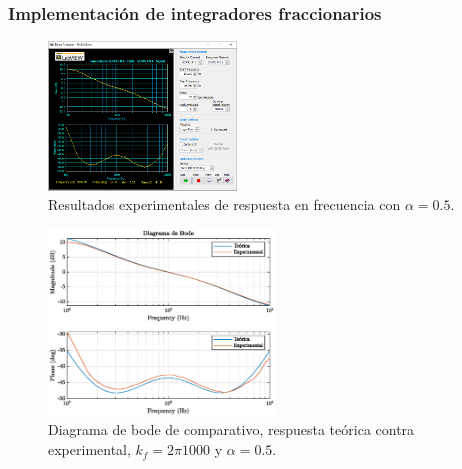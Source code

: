 \documentclass[10pt]{beamer}
\begin{document}
	\begin{frame}
		\frametitle{Implementación de integradores fraccionarios}
		\begin{minipage}[t]{0.45\textwidth}
			\begin{figure}[!ht] 
		\caption{Resultados experimentales de respuesta en frecuencia con $\alpha = 0.5$.}
		\label{fig:W1_impl_seg_ord}
		\centering
		\includegraphics[width = 5cm]{../imagenes/W1_impl_seg_ord.png}
	\end{figure}
		\end{minipage} \hfill \begin{minipage}[t]{0.45\textwidth}
			\begin{figure}[!ht]
		\caption{Diagrama de bode de comparativo, respuesta teórica contra experimental,  $k_{f} = 2\pi 1000$ y  $\alpha = 0.5$.} 
		\label{fig:W2_seg_ord_teoria_exp}
		\centering
		\includegraphics[width=6cm]{../imagenes/W2_seg_ord_teoria_exp.eps}
	\end{figure}
		\end{minipage}
	\end{frame}
\end{document}
